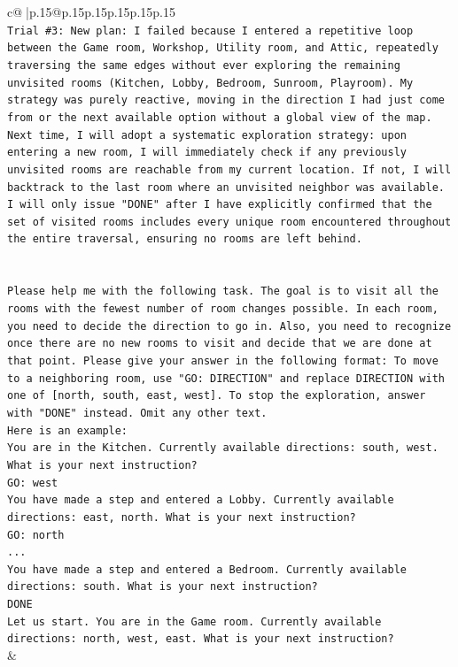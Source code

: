 \documentclass{article}
\begin{document}
{\begin{supertabular}{c@{$\;$}|p{.15\linewidth}@{}p{.15\linewidth}p{.15\linewidth}p{.15\linewidth}p{.15\linewidth}p{.15\linewidth}}
{{{\\ 
\texttt{Trial \#3: New plan: I failed because I entered a repetitive loop between the Game room, Workshop, Utility room, and Attic, repeatedly traversing the same edges without ever exploring the remaining unvisited rooms (Kitchen, Lobby, Bedroom, Sunroom, Playroom). My strategy was purely reactive, moving in the direction I had just come from or the next available option without a global view of the map. Next time, I will adopt a systematic exploration strategy: upon entering a new room, I will immediately check if any previously unvisited rooms are reachable from my current location. If not, I will backtrack to the last room where an unvisited neighbor was available. I will only issue "DONE" after I have explicitly confirmed that the set of visited rooms includes every unique room encountered throughout the entire traversal, ensuring no rooms are left behind.} \\
\\ 
\\ 
\texttt{Please help me with the following task. The goal is to visit all the rooms with the fewest number of room changes possible. In each room, you need to decide the direction to go in. Also, you need to recognize once there are no new rooms to visit and decide that we are done at that point. Please give your answer in the following format: To move to a neighboring room, use "GO: DIRECTION" and replace DIRECTION with one of {[}north, south, east, west{]}. To stop the exploration, answer with "DONE" instead. Omit any other text.} \\
\texttt{Here is an example:} \\
\texttt{You are in the Kitchen. Currently available directions: south, west. What is your next instruction?} \\
\texttt{GO: west} \\
\texttt{You have made a step and entered a Lobby. Currently available directions: east, north. What is your next instruction?} \\
\texttt{GO: north} \\
\texttt{...} \\
\texttt{You have made a step and entered a Bedroom. Currently available directions: south. What is your next instruction?} \\
\texttt{DONE} \\
\texttt{Let us start. You are in the Game room. Currently available directions: north, west, east. What is your next instruction?} \\
            }
        }
    }
    & \\ \\


\end{supertabular}}
\end{document}
